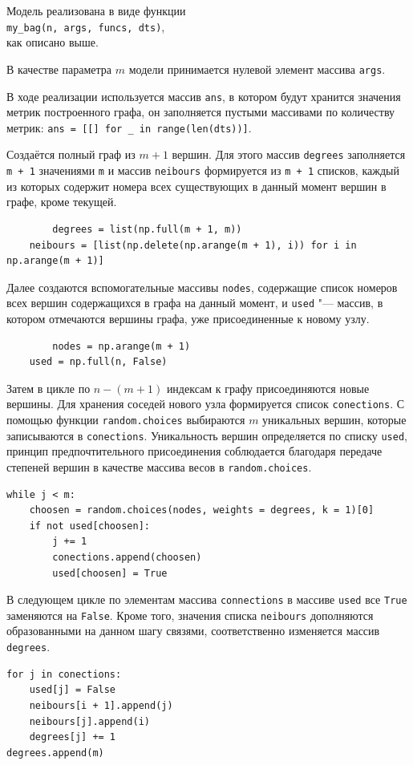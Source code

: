 \documentclass[bachelor, och, diploma]{SCWorks}
\begin{document}
Модель реализована в виде функции\\
\texttt{my_bag(n, args, funcs, dts)},\\
как описано выше.

В качестве параметра $m$ модели принимается нулевой элемент массива \texttt{args}. 

В ходе реализации используется массив \texttt{ans}, в котором будут хранится значения метрик построенного графа, он заполняется пустыми массивами по количеству метрик: \linebreak\texttt{ans = [[] for _ in range(len(dts))]}.

Создаётся полный граф из $ m + 1$ вершин. Для этого массив \texttt{degrees} заполняется \texttt{m + 1} значениями \texttt{m} и массив \texttt{neibours} формируется из \texttt{m + 1} списков, каждый из которых содержит номера всех существующих в данный момент вершин в графе, кроме текущей.
\begin{verbatim}
		degrees = list(np.full(m + 1, m))
    neibours = [list(np.delete(np.arange(m + 1), i)) for i in np.arange(m + 1)]
\end{verbatim}
Далее создаются вспомогательные массивы \texttt{nodes}, содержащие список номеров всех вершин содержащихся в графа на данный момент, и \texttt{used} "--- массив, в котором отмечаются вершины графа, уже присоединенные к новому узлу. 
\begin{verbatim}
		nodes = np.arange(m + 1)
    used = np.full(n, False)
\end{verbatim}

Затем в цикле по $n - (m + 1)$ индексам к графу присоединяются новые вершины. Для хранения соседей нового узла формируется список \texttt{conections}. С помощью функции \texttt{random.choices} выбираются $m$ уникальных вершин, которые записываются в \texttt{conections}. Уникальность вершин определяется по списку \texttt{used}, принцип предпочтительного присоединения соблюдается благодаря передаче степеней вершин в качестве массива весов в \texttt{random.choices}.
\begin{verbatim}
while j < m:
    choosen = random.choices(nodes, weights = degrees, k = 1)[0]
    if not used[choosen]:
        j += 1
        conections.append(choosen)
        used[choosen] = True
\end{verbatim}

В следующем цикле по элементам массива \texttt{connections}  в массиве \texttt{used} все \texttt{True} заменяются на \texttt{False}. Кроме того, значения списка \texttt{neibours} дополняются образованными на данном шагу связями, соответственно изменяется массив \texttt{degrees}. 
\begin{verbatim}
for j in conections:
    used[j] = False
    neibours[i + 1].append(j)
    neibours[j].append(i)
    degrees[j] += 1
degrees.append(m)
\end{verbatim}
\end{document}
